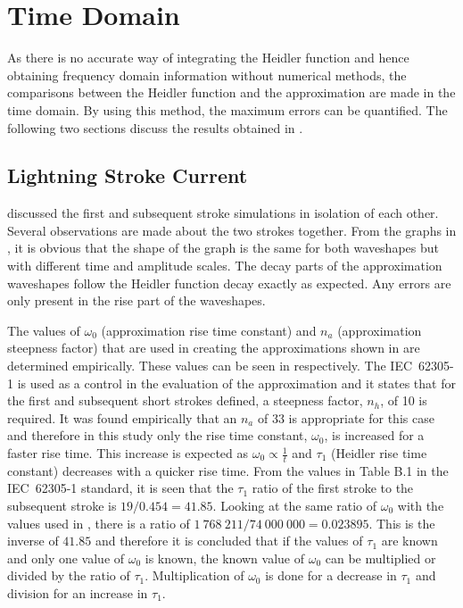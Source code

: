 \section{Time Domain}
\label{sec:discussion_time_domain}
As there is no accurate way of integrating the Heidler function and hence obtaining frequency domain information without numerical methods, the comparisons between the Heidler function and the approximation are made in the time domain. By using this method, the maximum errors can be quantified. The following two sections discuss the results obtained in .

\subsection{Lightning Stroke Current}
\label{sub:discussion_lightning_stroke_current}
 discussed the first and subsequent stroke simulations in isolation of each other. Several observations are made about the two strokes together. From the graphs in , it is obvious that the shape of the graph is the same for both waveshapes but with different time and amplitude scales. The decay parts of the approximation waveshapes follow the Heidler function decay exactly as expected. Any errors are only present in the rise part of the waveshapes.

The values of $\omega_0$ (approximation rise time constant) and $n_a$ (approximation steepness factor) that are used in creating the approximations shown in  are determined empirically. These values can be seen in  respectively. The IEC~62305-1 is used as a control in the evaluation of the approximation and it states that for the first and subsequent short strokes defined, a steepness factor, $n_h$, of 10 is required. It was found empirically that an $n_a$ of 33 is appropriate for this case and therefore in this study only the rise time constant, $\omega_0$, is increased for a faster rise time. This increase is expected as $\omega_0 \propto \frac{1}{t}$ and $\tau_1$ (Heidler rise time constant) decreases with a quicker rise time. From the values in Table B.1 in the IEC~62305-1 standard, it is seen that the $\tau_1$ ratio of the first stroke to the subsequent stroke is $19/0.454 = 41.85$. Looking at the same ratio of $\omega_0$ with the values used in , there is a ratio of $1\ 768\ 211/74\ 000\ 000 = 0.023895$. This is the inverse of $41.85$ and therefore it is concluded that if the values of $\tau_1$ are known and only one value of $\omega_0$ is known, the known value of $\omega_0$ can be multiplied or divided by the ratio of $\tau_1$. Multiplication of $\omega_0$ is done for a decrease in $\tau_1$ and division for an increase in $\tau_1$.

